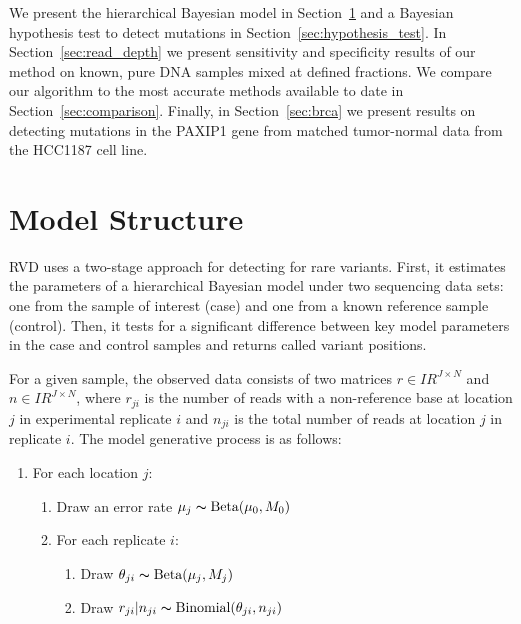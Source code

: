\documentclass[11pt,reqno]{amsart}
\newcommand{\RR}{I\!\!R} %
\begin{document}
We present the hierarchical Bayesian model in Section~\ref{sec:model_structure} and a Bayesian hypothesis test to detect mutations in Section~\ref{sec:hypothesis_test}. In Section~\ref{sec:read_depth} we present sensitivity and specificity results of our method on known, pure DNA samples mixed at defined fractions. We compare our algorithm to the most accurate methods available to date in Section~\ref{sec:comparison}. Finally, in Section~\ref{sec:brca} we present results on detecting mutations in the PAXIP1 gene from matched tumor-normal data from the HCC1187 cell line.

\section{Model Structure}\label{sec:model_structure}

RVD uses a two-stage approach for detecting for rare variants. First, it estimates the parameters of a hierarchical Bayesian model under two sequencing data sets: one from the sample of interest (case) and one from a known reference sample (control). Then, it tests for a significant difference between key model parameters in the case and control samples and returns called variant positions.

For a given sample, the observed data consists of two matrices $r \in \RR^{J \times N}$ and $n \in \RR^{J \times N}$, where $r_{ji}$ is the number of reads with a non-reference base at location $j$ in experimental replicate $i$ and $n_{ji}$ is the total number of reads at location $j$ in replicate $i$. The model generative process is as follows:

\begin{enumerate}[noitemsep]
	\item For each location $j$: 
	\begin{enumerate}
		\item Draw an error rate $\mu_j \thicksim \text{Beta}(\mu_0, M_0)$
		\item For each replicate $i$:
		\begin{enumerate}
			\item Draw $\theta_{ji} \thicksim \text{Beta}(\mu_j, M_j)$
			\item Draw $r_{ji} | n_{ji} \thicksim \text{Binomial}(\theta_{ji}, n_{ji})$
		\end{enumerate}
	\end{enumerate}
\end{enumerate}
\end{document}
